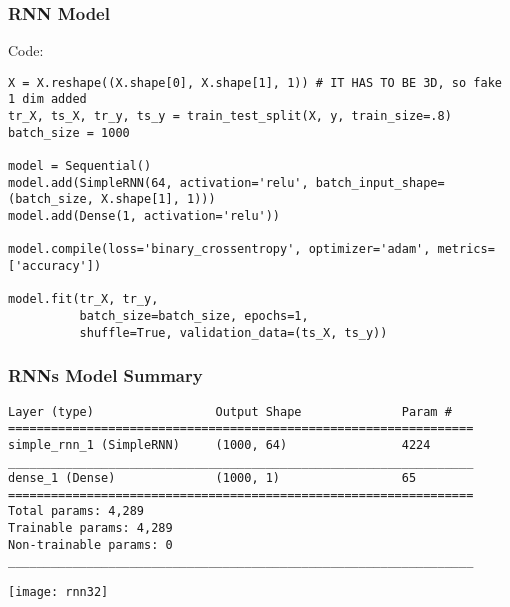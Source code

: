 \begin{frame}[fragile] \frametitle{RNN Model}
Code: 
\begin{lstlisting}
X = X.reshape((X.shape[0], X.shape[1], 1)) # IT HAS TO BE 3D, so fake 1 dim added
tr_X, ts_X, tr_y, ts_y = train_test_split(X, y, train_size=.8)
batch_size = 1000

model = Sequential()
model.add(SimpleRNN(64, activation='relu', batch_input_shape=(batch_size, X.shape[1], 1)))
model.add(Dense(1, activation='relu'))

model.compile(loss='binary_crossentropy', optimizer='adam', metrics=['accuracy'])

model.fit(tr_X, tr_y,
          batch_size=batch_size, epochs=1,
          shuffle=True, validation_data=(ts_X, ts_y))
\end{lstlisting}



\end{frame}

\begin{frame}[fragile] \frametitle{RNNs Model Summary}
\begin{lstlisting}
Layer (type)                 Output Shape              Param #   
=================================================================
simple_rnn_1 (SimpleRNN)     (1000, 64)                4224      
_________________________________________________________________
dense_1 (Dense)              (1000, 1)                 65        
=================================================================
Total params: 4,289
Trainable params: 4,289
Non-trainable params: 0
_________________________________________________________________
\end{lstlisting}


\begin{center}
\texttt{[image: rnn32]}
\end{center}


\end{frame}



